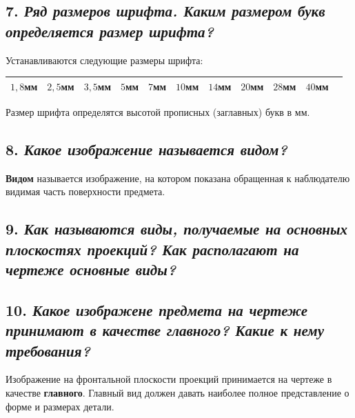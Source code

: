 \subsection*{7. \textit{Ряд размеров шрифта. Каким размером букв определяется размер шрифта?}}

Устанавливаются следующие размеры шрифта:
\begin{center}
\begin{tabular}{|c|c|c|c|c|c|c|c|c|c|c|}
\hline




$1,8$мм&$2,5$мм&$3,5$мм&$5$мм&$7$мм&$10$мм&$14$мм&$20$мм&$28$мм&$40$мм\\ \hline

\hline
\end{tabular}
\end{center}

Размер шрифта определятся высотой прописных (заглавных) букв в мм.
\subsection*{8. \textit{Какое изображение называется видом?}}

\textbf{Видом} называется изображение, на котором показана обращенная к наблюдателю видимая часть поверхности предмета.
\subsection*{9. \textit{Как называются виды, получаемые на основных плоскостях проекций? Как располагают на чертеже основные виды?}}



\subsection*{10. \textit{Какое изображене предмета на чертеже принимают в качестве главного? Какие к нему требования?}}

Изображение на фронтальной плоскости проекций принимается на чертеже в качестве {\bf главного}. Главный вид должен давать наиболее полное представление о форме и размерах детали.

